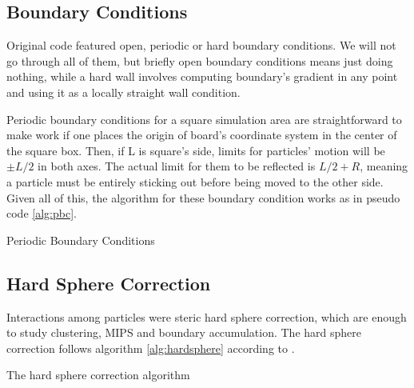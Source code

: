 \documentclass[../../master_thesis_np.tex]{subfiles}
\begin{document}
	\subsection{Boundary Conditions}
	Original code featured open, periodic or hard boundary conditions. We will not go through all of them, but briefly open boundary conditions means just doing nothing, while a hard wall involves computing boundary's gradient in any point and using it as a locally straight wall condition.
	
	Periodic boundary conditions for a square simulation area are straightforward to make work if one places the origin of board's coordinate system in the center of the square box. Then, if L is square's side, limits for particles' motion will be $\pm L/2$ in both axes. The actual limit for them to be reflected is $L/2 + R$, meaning a particle must be entirely sticking out before being moved to the other side. Given all of this, the algorithm for these boundary condition works as in pseudo code \ref{alg:pbc}.
	
	\begin{algorithm}[htp]
		\caption{Periodic Boundary Conditions} \label{alg:pbc}	
		\begin{algorithmic}[1]
			\EndIf
			\EndIf
			\EndFor
		\end{algorithmic}
	\end{algorithm}
	
	\subsection{Hard Sphere Correction}
	Interactions among particles were steric hard sphere correction, which are enough to study clustering, MIPS and boundary accumulation. The hard sphere correction follows algorithm \ref{alg:hardsphere} according to \cite{callegari_numerical_2019}.
	

	\begin{algorithm}[htp]
		\caption{The hard sphere correction algorithm} \label{alg:hardsphere}	
		\begin{algorithmic}[1]
			 

			\EndIf
			\EndFor
		\end{algorithmic}
		\end{algorithm}
\end{document}
